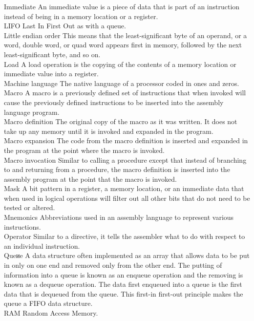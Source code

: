 \documentclass[10pt]{book}
\begin{document}
\begin{center}
\begin{center}
\begin{center}
\begin{center}
\begin{center}
Immediate An immediate value is a piece of data that is part of an instruction instead of being in a memory location or a register.\\
LIFO Last In First Out as with a queue.\\
Little endian order This means that the least-significant byte of an operand, or a word, double word, or quad word appears first in memory, followed by the next least-significant byte, and so on.\\
Load A load operation is the copying of the contents of a memory location or immediate value into a register.\\
Machine language The native language of a processor coded in ones and zeros.\\
Macro A macro is a previously defined set of instructions that when invoked will cause the previously defined instructions to be inserted into the assembly language program.\\
Macro definition The original copy of the macro as it was written. It does not take up any memory until it is invoked and expanded in the program.\\
Macro expansion The code from the macro definition is inserted and expanded in the program at the point where the macro is invoked.\\
Macro invocation Similar to calling a procedure except that instead of branching to and returning from a procedure, the macro definition is inserted into the assembly program at the point that the macro is invoked.\\
Mask A bit pattern in a register, a memory location, or an immediate data that when used in logical operations will filter out all other bits that do not need to be tested or altered.\\
Mnemonics Abbreviations used in an assembly language to represent various instructions.\\
Operator Similar to a directive, it tells the assembler what to do with respect to an individual instruction.\\
Queиe A data structure often implemented as an array that allows data to be put in only on one end and removed only from the other end. The putting of information into a queue is known as an enqueue operation and the removing is known as a dequeue operation. The data first enqueued into a queue is the first data that is dequeued from the queue. This first-in first-out principle makes the queue a FIFO data structure.\\
RAM Random Access Memory.\\

\end{center}
\end{center}
\end{center}
\end{center}
\end{center}
\end{document}
